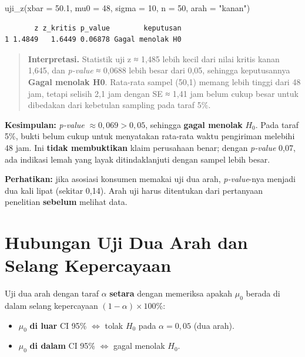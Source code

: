 \documentclass[
  indonesian,
  letterpaper,
]{book}
\newenvironment{Shaded}{\begin{snugshade}}{\end{snugshade}}
\newcommand{\AttributeTok}[1]{\textcolor[rgb]{0.40,0.45,0.13}{#1}}
\newcommand{\DecValTok}[1]{\textcolor[rgb]{0.68,0.00,0.00}{#1}}
\newcommand{\FloatTok}[1]{\textcolor[rgb]{0.68,0.00,0.00}{#1}}
\newcommand{\FunctionTok}[1]{\textcolor[rgb]{0.28,0.35,0.67}{#1}}
\newcommand{\NormalTok}[1]{\textcolor[rgb]{0.00,0.23,0.31}{#1}}
\newcommand{\StringTok}[1]{\textcolor[rgb]{0.13,0.47,0.30}{#1}}
\providecommand{\tightlist}{%
  \setlength{\itemsep}{0pt}\setlength{\parskip}{0pt}}
\begin{document}
\begin{Shaded}
\begin{Highlighting}[]
\FunctionTok{uji\_z}\NormalTok{(}\AttributeTok{xbar =} \FloatTok{50.1}\NormalTok{, }\AttributeTok{mu0 =} \DecValTok{48}\NormalTok{, }\AttributeTok{sigma =} \DecValTok{10}\NormalTok{, }\AttributeTok{n =} \DecValTok{50}\NormalTok{, }\AttributeTok{arah =} \StringTok{"kanan"}\NormalTok{)}
\end{Highlighting}
\end{Shaded}

\begin{verbatim}
       z z_kritis p_value        keputusan
1 1.4849   1.6449 0.06878 Gagal menolak H0
\end{verbatim}

\begin{quote}
\textbf{Interpretasi.} Statistik uji z ≈ 1,485 lebih kecil dari nilai
kritis kanan 1,645, dan \emph{p-value} ≈ 0,0688 lebih besar dari 0,05,
sehingga keputusannya \textbf{Gagal menolak H0}. Rata-rata sampel (50,1)
memang lebih tinggi dari 48 jam, tetapi selisih 2,1 jam dengan SE ≈ 1,41
jam belum cukup besar untuk dibedakan dari kebetulan sampling pada taraf
5\%.
\end{quote}

\textbf{Kesimpulan:} \emph{p-value} \(\approx 0{,}069 > 0{,}05\),
sehingga \textbf{gagal menolak} \(H_0\). Pada taraf 5\%, bukti belum
cukup untuk menyatakan rata-rata waktu pengiriman melebihi 48 jam. Ini
\textbf{tidak membuktikan} klaim perusahaan benar; dengan \emph{p-value}
0,07, ada indikasi lemah yang layak ditindaklanjuti dengan sampel lebih
besar.

\textbf{Perhatikan:} jika asosiasi konsumen memakai uji dua arah,
\emph{p-value}-nya menjadi dua kali lipat (sekitar 0,14). Arah uji harus
ditentukan dari pertanyaan penelitian \textbf{sebelum} melihat data.

\section{Hubungan Uji Dua Arah dan Selang
Kepercayaan}\label{hubungan-uji-dua-arah-dan-selang-kepercayaan}

Uji dua arah dengan taraf \(\alpha\) \textbf{setara} dengan memeriksa
apakah \(\mu_0\) berada di dalam selang kepercayaan
\((1 - \alpha) \times 100\%\):

\begin{itemize}
\tightlist
\item
  \(\mu_0\) \textbf{di luar} CI 95\% \(\iff\) tolak \(H_0\) pada
  \(\alpha = 0{,}05\) (dua arah).
\item
  \(\mu_0\) \textbf{di dalam} CI 95\% \(\iff\) gagal menolak \(H_0\).
\end{itemize}
\end{document}
